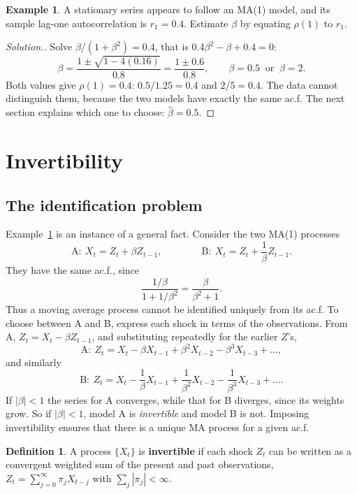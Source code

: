 \documentclass[11pt,a4paper]{article}
\theoremstyle{definition}
\newtheorem{defn}[thm]{Definition}
\newtheorem{exa}[thm]{Example}
\newenvironment{solution}
  {\renewcommand{\qedsymbol}{}\begin{proof}[\textit{Solution}.]}
  {\end{proof}}
\begin{document}
\begin{exa}\label{exa:ma1-moments}
A stationary series appears to follow an MA(1) model, and its sample lag-one autocorrelation is $r_1 = 0.4$. Estimate
$\beta$ by equating $\rho(1)$ to $r_1$.
\end{exa}

\begin{solution}
Solve $\beta/(1 + \beta^2) = 0.4$, that is $0.4\beta^2 - \beta + 0.4 = 0$:
\[
\beta = \frac{1 \pm \sqrt{1 - 4(0.16)}}{0.8} = \frac{1 \pm 0.6}{0.8} , \qquad \beta = 0.5 \ \text{ or } \ \beta = 2 .
\]
Both values give $\rho(1) = 0.4$: $0.5/1.25 = 0.4$ and $2/5 = 0.4$. The data cannot distinguish them, because the two
models have exactly the same ac.f. The next section explains which one to choose: $\hat\beta = 0.5$.
\end{solution}

\section{Invertibility}\label{sec:invertibility}
\subsection{The identification problem}
Example~\ref{exa:ma1-moments} is an instance of a general fact. Consider the two MA(1) processes
\[
\text{A}: \ X_t = Z_t + \beta Z_{t-1} , \qquad\qquad \text{B}: \ X_t = Z_t + \frac1\beta Z_{t-1} .
\]
They have the same ac.f., since
\[
\frac{1/\beta}{1 + 1/\beta^2} = \frac{\beta}{\beta^2 + 1} .
\]
Thus a moving average process cannot be identified uniquely from its ac.f. To choose between A and B,
express each shock in terms of the observations. From A, $Z_t = X_t - \beta Z_{t-1}$, and substituting repeatedly for the
earlier $Z$'s,
\[
\text{A}: \ Z_t = X_t - \beta X_{t-1} + \beta^2X_{t-2} - \beta^3X_{t-3} + \dots ,
\]
and similarly
\[
\text{B}: \ Z_t = X_t - \frac1\beta X_{t-1} + \frac1{\beta^2}X_{t-2} - \frac1{\beta^3}X_{t-3} + \dots .
\]
If $|\beta| < 1$ the series for A converges, while that for B diverges, since its weights grow. So if $|\beta| < 1$, model A is
\emph{invertible} and model B is not. Imposing invertibility ensures that there is a unique MA process for a
given ac.f.

\begin{defn}
A process $\{X_t\}$ is \textbf{invertible} if each shock $Z_t$ can be written as a convergent weighted
sum of the present and past observations, $Z_t = \sum_{j=0}^\infty\pi_jX_{t-j}$ with $\sum_j|\pi_j| < \infty$.
\end{defn}
\end{document}
